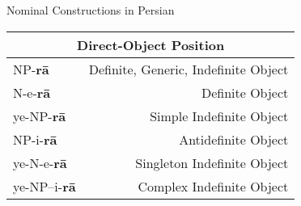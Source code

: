 \documentclass[10pt]{beamer}
\begin{document}
\begin {frame} {Nominal Constructions in Persian}

\begin {tabular}{l | r}
\multicolumn{2}{c}{Direct-Object Position} \\\hline
\hspace{0.44cm}NP-\textbf{r\={a}} & Definite, Generic, Indefinite Object\\ \hline
\hspace{0.44cm}N-{\color {red}e}-\textbf{r\={a}} & Definite Object\\ \hline
{\color {ggreen}ye}-NP-\textbf{r\={a}} & Simple Indefinite Object\\ \hline
\hspace{0.44cm}NP-{\color {blue}i}-\textbf{r\={a}} & Antidefinite Object\\ \hline
{\color {ggreen}ye}-N-{\color {red}e}-\textbf{r\={a}} & Singleton Indefinite Object\\ \hline
{\color {ggreen}ye}-NP--{\color {blue}i}-\textbf{r\={a}} & Complex Indefinite Object\\\hline
\end {tabular}

\end {frame}
\end{document}

